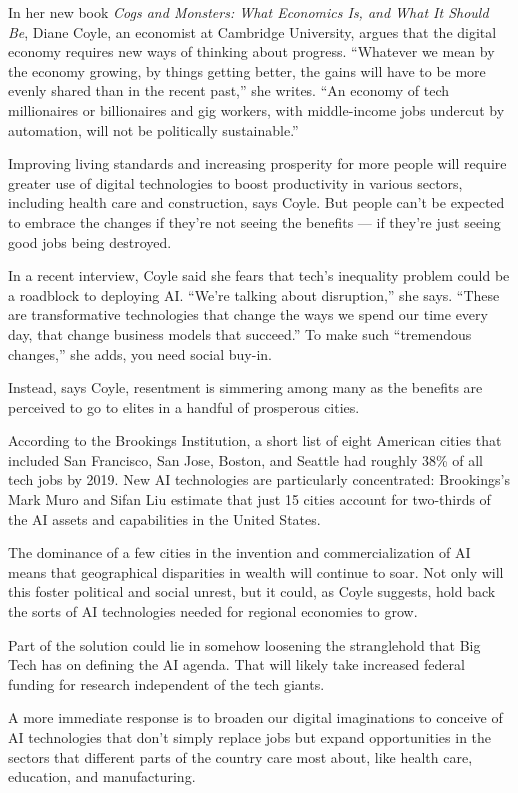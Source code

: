 \documentclass[UTF8,11pt]{ctexart}
\begin{document}
In her new book \textit{Cogs and Monsters: What Economics Is, and What It Should Be}, Diane Coyle, an economist at Cambridge University, argues that the digital economy requires new ways of thinking about progress. “Whatever we mean by the economy growing, by things getting better, the gains will have to be more evenly shared than in the recent past,” she writes. “An economy of tech millionaires or billionaires and gig workers, with middle-income jobs undercut by automation, will not be politically sustainable.”


Improving living standards and increasing prosperity for more people will require greater use of digital technologies to boost productivity in various sectors, including health care and construction, says Coyle. But people can’t be expected to embrace the changes if they’re not seeing the benefits — if they’re just seeing good jobs being destroyed.


In a recent interview, Coyle said she fears that tech’s inequality problem could be a roadblock to deploying AI. “We’re talking about disruption,” she says. “These are transformative technologies that change the ways we spend our time every day, that change business models that succeed.” To make such “tremendous changes,” she adds, you need social buy-in.


Instead, says Coyle, resentment is simmering among many as the benefits are perceived to go to elites in a handful of prosperous cities.


According to the Brookings Institution, a short list of eight American cities that included San Francisco, San Jose, Boston, and Seattle had roughly 38\% of all tech jobs by 2019. New AI technologies are particularly concentrated: Brookings’s Mark Muro and Sifan Liu estimate that just 15 cities account for two-thirds of the AI assets and capabilities in the United States.


The dominance of a few cities in the invention and commercialization of AI means that geographical disparities in wealth will continue to soar. Not only will this foster political and social unrest, but it could, as Coyle suggests, hold back the sorts of AI technologies needed for regional economies to grow.


Part of the solution could lie in somehow loosening the stranglehold that Big Tech has on defining the AI agenda. That will likely take increased federal funding for research independent of the tech giants.


A more immediate response is to broaden our digital imaginations to conceive of AI technologies that don’t simply replace jobs but expand opportunities in the sectors that different parts of the country care most about, like health care, education, and manufacturing.
\end{document}
